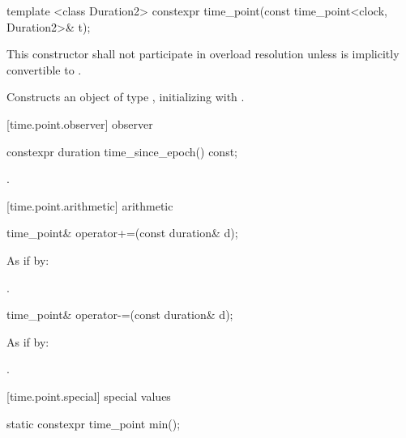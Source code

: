 %
\begin{itemdecl}
template <class Duration2>
  constexpr time_point(const time_point<clock, Duration2>& t);
\end{itemdecl}

\begin{itemdescr}
\pnum
\remarks This constructor shall not participate in overload resolution unless 
is implicitly convertible to .

\pnum
\effects Constructs an object of type , initializing
 with .
\end{itemdescr}

[time.point.observer]{ observer}

%
\begin{itemdecl}
constexpr duration time_since_epoch() const;
\end{itemdecl}

\begin{itemdescr}
\pnum
\returns {}.
\end{itemdescr}

[time.point.arithmetic]{ arithmetic}

%
\begin{itemdecl}
time_point& operator+=(const duration& d);
\end{itemdecl}

\begin{itemdescr}
\pnum
\effects As if by: 

\pnum
\returns {}.
\end{itemdescr}

%
\begin{itemdecl}
time_point& operator-=(const duration& d);
\end{itemdecl}

\begin{itemdescr}
\pnum
\effects As if by: 

\pnum
\returns {}.
\end{itemdescr}

[time.point.special]{ special values}

%
\begin{itemdecl}
static constexpr time_point min();
\end{itemdecl}


